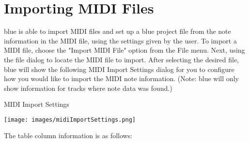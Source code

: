 \section{Importing MIDI Files}\label{importMIDI}

blue is able to import MIDI files and set up a blue project file from
the note information in the MIDI file, using the settings given by the
user. To import a MIDI file, choose the "Import MIDI File" option from
the File menu. Next, using the file dialog to locate the MIDI file to
import. After selecting the desired file, blue will show the following
MIDI Import Settings dialog for you to configure how you would like to
import the MIDI note information. (Note: blue will only show information
for tracks where note data was found.)

MIDI Import Settings

\texttt{[image: images/midiImportSettings.png]}

The table column information is as follows:

